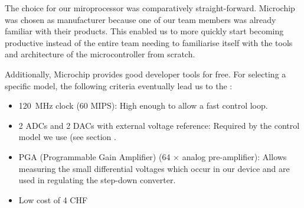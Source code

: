 The choice for our miroprocessor was comparatively straight-forward. Microchip
was  chosen as  manufacturer  because  one of  our  team  members was  already
familiar with their  products. This enabled us to more  quickly start becoming
productive instead of  the entire team needing to familiarise  itself with the
tools and architecture of the microcontroller from scratch.

Additionally, Microchip provides good  developer tools for free. For selecting
a  specific  model,   the  following  criteria  eventually  lead   us  to  the
:

\begin{itemize}
    \item
        \SI{120}{\mega\hertz}  clock (60  MIPS): High enough  to allow  a fast
        control loop.
    \item
        2 ADCs  and 2  DACs with external  voltage reference: Required  by the
        control model we use (see section .
    \item
        PGA    (Programmable    Gain    Amplifier)   (64    $\times$    analog
        pre-amplifier): Allows measuring the small differential voltages which
        occur  in  our  device  and  are  used  in  regulating  the  step-down
        converter.
    \item
        Low cost of 4 CHF
\end{itemize}
